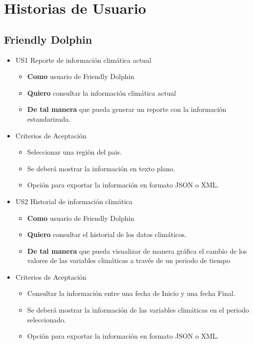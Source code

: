 \section*{Historias de Usuario}
\subsection*{Friendly Dolphin}
  \begin{itemize}
    \item US1 Reporte de información climática actual
    \begin{itemize}
      \item \textbf{Como} usuario de Friendly Dolphin
      \item \textbf{Quiero} consultar la información climática actual
      \item \textbf{De tal manera} que pueda generar un reporte con la información estandarizada.
    \end{itemize}
    \item Criterios de Aceptación
    \begin{itemize}
      \item Seleccionar una región del pais.
      \item Se deberá mostrar la información en texto plano.
      \item Opción para exportar la información en formato JSON o XML.
    \end{itemize}
  \end{itemize}
  \begin{itemize}
    \item US2 Historial de información climática
    \begin{itemize}
      \item \textbf{Como} usuario de Friendly Dolphin
      \item \textbf{Quiero} consultar el historial de los datos climáticos.
      \item \textbf{De tal manera} que pueda visualizar de manera gráfica el cambio de los valores de las variables climáticas a través de un periodo de tiempo
    \end{itemize}
    \item Criterios de Aceptación
    \begin{itemize}
      \item Consultar la información entre una fecha de Inicio y una fecha Final.
      \item Se deberá mostrar la información de las variables climáticas en el periodo seleccionado.
      \item Opción para exportar la información en formato JSON o XML.
    \end{itemize}
  \end{itemize}
%
%
\newpage
